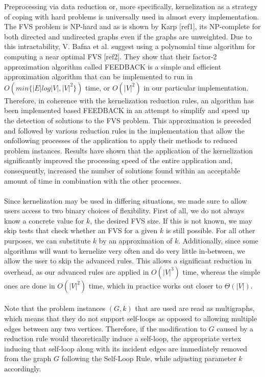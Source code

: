 Preprocessing via data reduction or, more specifically, kernelization as a strategy of coping with hard problems is universally used in almost every implementation. The FVS problem is NP-hard and as is shown by Karp [ref1], its NP-complete for both directed and undirected graphs even if the graphs are unweighted. Due to this intractability, V. Bafna et al. suggest using a polynomial time algorithm for computing a near optimal FVS [ref2]. They show that their factor-2 approximation algorithm called \textsc{ FEEDBACK} is a simple and efficient approximation algorithm that can be implemented to run in $O(min\{|E| log |V |, |V |^2\})$ time, or $O(|V |^2)$ in our particular implementation. Therefore, in coherence with the kernelization reduction rules, an algorithm has been implemented based \textsc{ FEEDBACK} in an attempt to simplify and speed up the detection of solutions to the FVS problem. This approximation is preceded and followed by various reduction rules in the implementation that allow the onfollowing processes of the application to apply their methods to reduced problem instances. Results have shown that the application of the kernelization significantly improved the processing speed of the entire application and, consequently, increased the number of solutions found within an acceptable amount of time in combination with the other processes. \\\\
Since kernelization may be used in differing situations, we made sure to allow users access to two binary choices of flexibility. First of all, we do not always know a concrete value for $k$, the desired FVS size. If this is not known, we may skip tests that check whether an FVS for a given $k$ is still possible. For all other purposes, we can substitute $k$ by an approximation of $k$. Additionally, since some algorithms will want to kernelize very often and do very little in-between, we allow the user to skip the advanced rules. This allows a significant reduction in overhead, as our advanced rules are applied in $O(|V|^3)$ time, whereas the simple ones are done in $O(|V|^2)$ time, which in practice works out closer to $\Theta(|V|)$.\\\\
Note that the problem instances $(G,k)$ that are used are read as multigraphs, which means that they do not support self-loops as opposed to allowing multiple edges between any two vertices. Therefore, if the modification to $G$ caused by a reduction rule would theoretically induce a self-loop, the appropriate vertex inducing that self-loop along with its incident edges are immediately removed from the graph $G$ following the Self-Loop Rule, while adjusting parameter $k$ accordingly.

